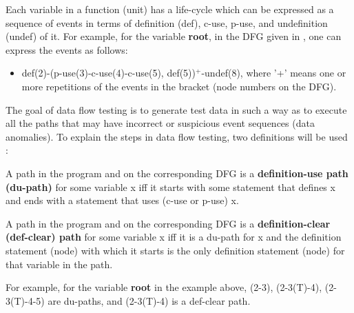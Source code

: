 Each variable in a function (unit) has a life-cycle which can be expressed as a sequence of events in terms of definition (def), c-use, p-use, and undefinition (undef) of it. For example, for the variable \textbf{root}, in the DFG given in  , one can express the events as follows:
\begin{itemize}
    \item def(2)-(p-use(3)-c-use(4)-c-use(5), def(5))$^+$-undef(8), where '+' means one or more repetitions of the events in the bracket (node numbers on the DFG).
\end{itemize}
The goal of data flow testing is to generate test data in such a way as to execute all the paths that may have incorrect or suspicious event sequences (data anomalies). To explain the steps in data flow testing, two definitions will be used \autocite{mili2015software}:

\begin{definition}
A path in the program and on the corresponding DFG is a \textbf{definition-use path (du-path)} for some variable x iff it starts with some statement that defines x and ends with a statement that uses (c-use or p-use) x.
\end{definition}

\begin{definition}
A path in the program and on the corresponding DFG is a \textbf{definition-clear (def-clear) path} for some variable x iff it is a du-path for x and the definition statement (node) with which it starts is the only definition statement (node) for that variable in the path.
\end{definition}

For example, for the variable \textbf{root} in the example above, (2-3), (2-3(T)-4), (2-3(T)-4-5) are du-paths, and (2-3(T)-4) is a def-clear path. 

